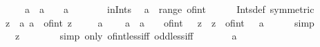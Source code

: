 \begin{isabellebody}
\ \ \ {\isachardoublequoteopen}{}\ {\isacharplus}{\kern0pt}\ a\ {\isacharplus}{\kern0pt}\ a\ {\isacharless}{\kern0pt}\ {}\ {\isasymlongleftrightarrow}\ a\ {\isacharless}{\kern0pt}\ {}{\isachardoublequoteclose}\isanewline
%
\isadelimproof
%
\endisadelimproof
%
\isatagproof
{}\isamarkupfalse%
\ {\isacharminus}{\kern0pt}\isanewline
\ \ \isamarkupfalse%
\ in{\isacharunderscore}{\kern0pt}Ints\ \isamarkupfalse%
\ {\isachardoublequoteopen}a\ {\isasymin}\ range\ of{\isacharunderscore}{\kern0pt}int{\isachardoublequoteclose}\isanewline
\ \ \ \ \isamarkupfalse%
\ Ints{\isacharunderscore}{\kern0pt}def\ {\isacharbrackleft}{\kern0pt}symmetric{\isacharbrackright}{\kern0pt}\ \isacommand{{\isachardot}{\kern0pt}}\isamarkupfalse%
\isanewline
\ \ \isamarkupfalse%
\ \isamarkupfalse%
\ z\ \ a{\isacharcolon}{\kern0pt}\ {\isachardoublequoteopen}a\ {\isacharequal}{\kern0pt}\ of{\isacharunderscore}{\kern0pt}int\ z{\isachardoublequoteclose}\ \isacommand{{\isachardot}{\kern0pt}{\isachardot}{\kern0pt}}\isamarkupfalse%
\isanewline
\ \ \isamarkupfalse%
\ a\ \isamarkupfalse%
\ {\isachardoublequoteopen}{}\ {\isacharplus}{\kern0pt}\ a\ {\isacharplus}{\kern0pt}\ a\ {\isacharless}{\kern0pt}\ {}\ {\isasymlongleftrightarrow}\ of{\isacharunderscore}{\kern0pt}int\ {\isacharparenleft}{\kern0pt}{}\ {\isacharplus}{\kern0pt}\ z\ {\isacharplus}{\kern0pt}\ z{\isacharparenright}{\kern0pt}\ {\isacharless}{\kern0pt}\ {\isacharparenleft}{\kern0pt}of{\isacharunderscore}{\kern0pt}int\ {}\ {\isacharcolon}{\kern0pt}{\isacharcolon}{\kern0pt}\ {\isacharprime}{\kern0pt}a{\isacharparenright}{\kern0pt}{\isachardoublequoteclose}\isanewline
\ \ \ \ \isamarkupfalse%
\ simp\isanewline
\ \ \isamarkupfalse%
\ \isamarkupfalse%
\ {\isachardoublequoteopen}{\isasymdots}\ {\isasymlongleftrightarrow}\ z\ {\isacharless}{\kern0pt}\ {}{\isachardoublequoteclose}\isanewline
\ \ \ \ \isamarkupfalse%
\ {\isacharparenleft}{\kern0pt}simp\ only{\isacharcolon}{\kern0pt}\ of{\isacharunderscore}{\kern0pt}int{\isacharunderscore}{\kern0pt}less{\isacharunderscore}{\kern0pt}iff\ odd{\isacharunderscore}{\kern0pt}less{\isacharunderscore}{\kern0pt}{}{\isacharunderscore}{\kern0pt}iff{\isacharparenright}{\kern0pt}\isanewline
\ \ \isamarkupfalse%
\ \isamarkupfalse%
\ {\isachardoublequoteopen}{\isasymdots}\ {\isasymlongleftrightarrow}\ a\ {\isacharless}{\kern0pt}\ {}{\isachardoublequoteclose}\isanewline

\end{isabellebody}
